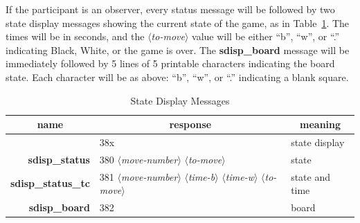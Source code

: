 \documentclass{article}
\newenvironment{resptab}[2]{
\begin{table}%
\centering
\caption{#2}%
\label{table-#1}%
\begin{tabular}{rll}%
\multicolumn{1}{c}{\bf name}&%
\multicolumn{1}{c}{\bf response}&%
\multicolumn{1}{c}{\bf meaning}\\\hline
}{\end{tabular}%
\end{table}}
\newcommand{\stok}[1]{{$\langle${\em #1}$\rangle$}}
\newcommand{\bfid}[1]{{\bf #1}}
\begin{document}
If the participant is an observer, every status message will
be followed by two state display messages showing the
current state of the game, as in Table~\ref{table-sdispmsgs}.
The times will be in seconds, and the \stok{to-move} value
will be either ``b'', ``w'', or ``.'' indicating 
Black, White, or the game is over.  The \bfid{sdisp\_board}
message will be immediately followed by 5 lines of
5 printable characters indicating the board state.
Each character will be as above: ``b'', ``w'', or
``.'' indicating a blank square.

\begin{resptab}{sdispmsgs}{State Display Messages}
                    & 38x & state display \\
\bfid{sdisp\_status}    & 380 \stok{move-number}
			    \stok{to-move} & state \\
\bfid{sdisp\_status\_tc}    & 381 \stok{move-number}
			    \stok{time-b}
			    \stok{time-w}
			    \stok{to-move} & state and time \\
\bfid{sdisp\_board} & 382 & board
\end{resptab}
\end{document}

